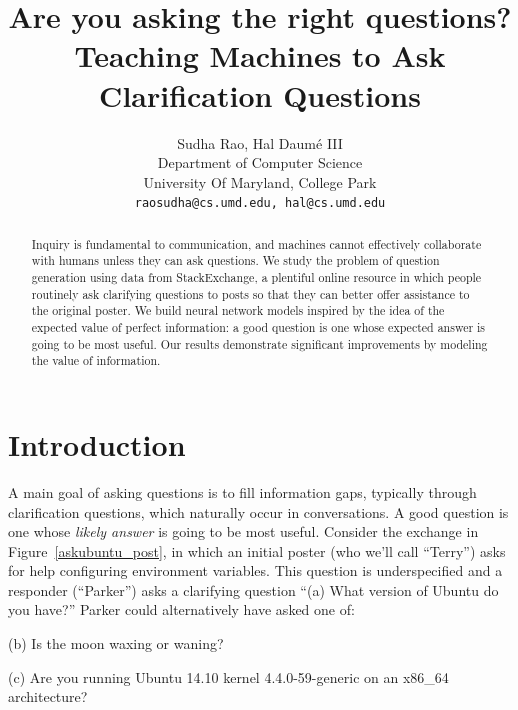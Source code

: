 \documentclass[11pt,a4paper]{article}
\author{Sudha Rao, Hal Daum\'e III \\
  Department of Computer Science \\
  University Of Maryland, College Park \\
  {\tt raosudha@cs.umd.edu, hal@cs.umd.edu}}
\title{Are you asking the right questions? \\ Teaching Machines to Ask Clarification Questions}
\date{}
\begin{document}
\maketitle
\begin{abstract}
Inquiry is fundamental to communication, and machines cannot effectively collaborate with humans unless they can ask questions. 
We study the problem of question generation using data from StackExchange, a plentiful online resource in which people routinely ask clarifying questions to posts so that they can better offer assistance to the original poster. We build neural network models inspired by the idea of the expected value of perfect information: a good question is one whose expected answer is going to be most useful. Our results demonstrate significant improvements by modeling the value of information.
\end{abstract}

\section{Introduction}\label{introduction}

A main goal of asking questions is to fill information gaps, typically through clarification questions, which naturally occur in conversations. 
A good question is one whose \emph{likely answer} is going to be most useful.
Consider the exchange in Figure~\ref{askubuntu_post}, in which an initial poster (who we'll call ``Terry'') asks for help configuring environment variables.
This question is underspecified and a responder (``Parker'') asks a clarifying question ``\textsf{\small (a) What version of Ubuntu do you have?}''
Parker could alternatively have asked one of:

\textsf{\small(b) Is the moon waxing or waning?}

\textsf{\small(c) Are you running Ubuntu 14.10 kernel 4.4.0-59-generic on an x86\_64 architecture?}
\end{document}
